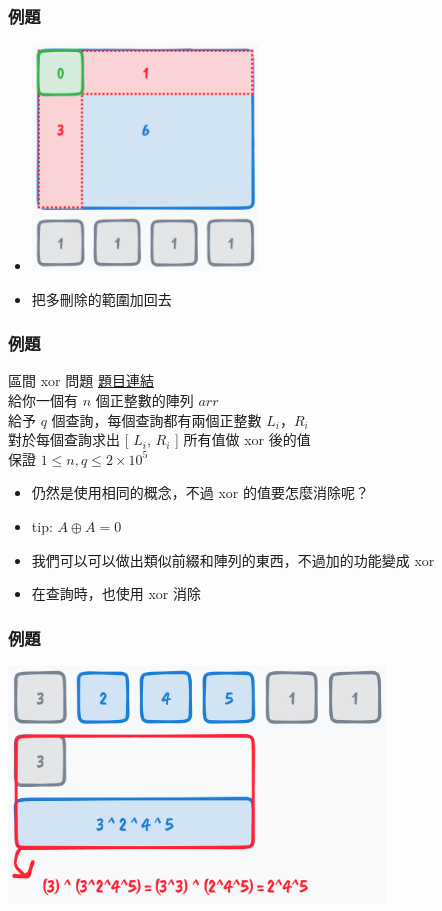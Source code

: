 \documentclass[mathserif]{beamer}
\begin{document}
\begin{frame}
    \frametitle{例題}
    \begin{itemize}
        \item \includegraphics[width=6.0cm]{img/6-9.png}
        \item 把多刪除的範圍加回去
    \end{itemize}
\end{frame}

\begin{frame}
    \frametitle{例題}
    \begin{block}{區間 xor 問題}
        \href{https://cses.fi/problemset/task/1650}{題目連結}\\
        給你一個有 $n$ 個正整數的陣列 $arr$\\
        給予 $q$ 個查詢，每個查詢都有兩個正整數 $L_i$，$R_i$\\
        對於每個查詢求出 [ $L_i$, $R_i$ ] 所有值做 xor 後的值\\

        保證 $1 \leq n, q \leq 2 \times 10^5$
    \end{block}
    \begin{itemize}
        \item 仍然是使用相同的概念，不過 xor 的值要怎麼消除呢？
        \item tip: $A \oplus A = 0$
        \item<2-> 我們可以可以做出類似前綴和陣列的東西，不過加的功能變成 xor
        \item<2-> 在查詢時，也使用 xor 消除
    \end{itemize}
\end{frame}

\begin{frame}
    \frametitle{例題}
    \includegraphics[width=10.0cm]{img/6-10.png}
\end{frame}
\end{document}
